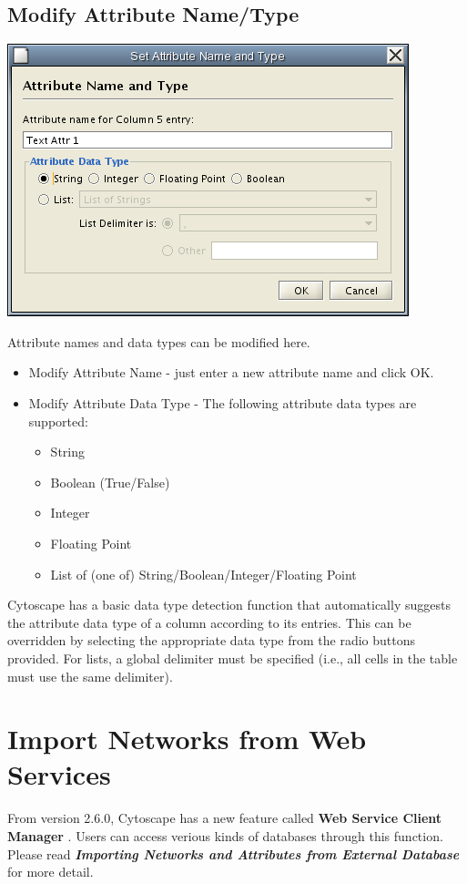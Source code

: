 \subsection{Modify Attribute Name/Type}

\begin{center}
 \includegraphics[width=\textwidth]{images/network_table_attr_dialog1.png} 
\end{center}

 Attribute names and data types can be modified here. 
\begin{itemize}
\item Modify Attribute Name - just enter a new attribute name and click OK. 
\item Modify Attribute Data Type - The following attribute data types are supported: \begin{itemize}
\item String 
\item Boolean (True/False) 
\item Integer 
\item Floating Point 
\item List of (one of) String/Boolean/Integer/Floating Point 
\end{itemize}
\end{itemize}
 Cytoscape has a basic data type detection function that automatically suggests the attribute data type of a column according to its entries. This can be overridden by selecting the appropriate data type from the radio buttons provided. For lists, a global delimiter must be specified (i.e., all cells in the table must use the same delimiter). 

\section{Import Networks from Web Services}
 From version 2.6.0, Cytoscape has a new feature called \textbf{Web Service Client Manager}
. Users can access verious kinds of databases through this function. Please read \emph{\textbf{Importing Networks and Attributes from External Database}
}
 for more detail. 

